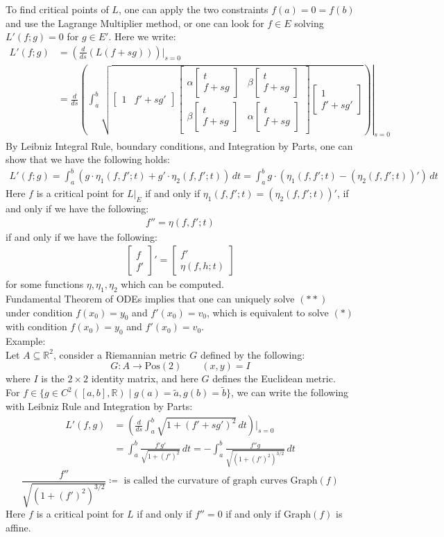 \documentclass[15pt]{book}
\theoremstyle{break}
\theoremstyle{break}
\newcommand{\R}{\mathbb{R}}
\newcommand{\that}[1]{\widetilde{#1}}
\newcommand{\bmat}[1]{\begin{bmatrix} #1 \end{bmatrix}}
\newcommand{\example}{\color{green}Example: \color{black}}
\begin{document}
To find critical points of $L$, one can apply the two constraints $f(a) = 0 = f(b)$ and use the Lagrange Multiplier method, or one can look for $f \in E$ solving $L'(f;g) = 0$ for $g \in E'$. Here we write:
\begin{align*}
L'(f;g) &= \left(\frac{d}{ds} \left(L (f+sg)\right)\right)|_{s= 0} \\
&= \left.\frac{d}{ds} \left(\int_a^b \sqrt{\bmat{1 & f'+sg'}\bmat{\alpha\bmat{t \\ f+sg}&\beta\bmat{t \\ f+sg}\\\beta\bmat{t \\ f+sg}&\alpha\bmat{t \\ f+sg}}\bmat{1 \\ f'+sg'}} \right)\right|_{s= 0}
 \end{align*}
By Leibniz Integral Rule, boundary conditions, and Integration by Parts, one can show that we have the following holds:
\begin{align*}
L'(f;g) = \int_a^b \left(g\cdot \eta_1(f,f';t) + g'\cdot \eta_2(f,f';t)\right) \, dt = \int_a^b g\cdot \left(\eta_1(f,f';t) - (\eta_2(f,f';t))'\right) \, dt
\end{align*}
Here $f$ is a critical point for $L|_E$ if and only if $\eta_1(f,f';t) = (\eta_2(f,f';t))'$, if and only if we have the following:
\begin{align*}
f'' = \eta(f,f';t) \tag{*}
\end{align*} 
if and only if we have the following:
\begin{align*}
\bmat{f \\ f'}' = \bmat{f' \\ \eta(f,h;t) }\tag{**}
\end{align*}
for some functions $\eta,\eta_1,\eta_2$ which can be computed. \\


Fundamental Theorem of ODEs implies that one can uniquely solve $(**)$ under condition $f(x_0) = y_0$ and $f'(x_0) = v_0$, which is equivalent to solve $(*)$ with condition $f(x_0) = y_0$ and $f'(x_0) = v_0$.\\

\example\\
Let $A \subseteq \R^2$, consider a Riemannian metric $G$ defined by the following: 
$$G:A \to \text{Pos}(2) \qquad (x,y)  = I$$ 
where $I$ is the $2\times 2$ identity matrix, and here $G$ defines the Euclidean metric. \\
For $f \in \{ g\in C^2([a,b], \R)\mid g(a) = \that{a}, g(b) = \that{b}\}$, we can write the following with Leibniz Rule and Integration by Parts:
\begin{align*}
L'(f,g) 
&= \left( \frac{d}{ds} \int_a^b \sqrt{1 + (f'+sg')^2}\, dt \right)|_{s= 0} \\
&= \int_a^b \frac{f'g'}{\sqrt{1+(f')^2}}\, dt = -\int_a^b \frac{f'' g}{\sqrt{(1+(f')^2)^{3/2}}}\, dt
\end{align*}
$$\frac{f''}{\sqrt{(1+(f')^2)^{3/2}}} \coloneqq \text{ is called the curvature of graph curves }\text{Graph}(f)$$
Here $f$ is a critical point for $L$ if and only if $f'' = 0$ if and only if $\text{Graph}(f)$ is affine. \\
\end{document}
